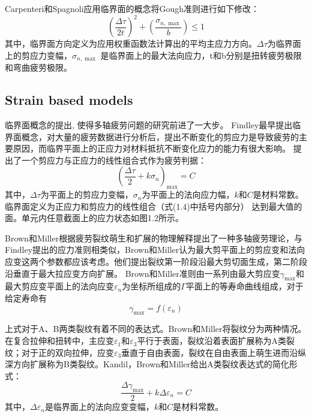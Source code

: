 Carpenteri和Spagnoli\cite{carpinteri2001multiaxial}应用临界面的概念将Gough准则进行如下修改：
\[{\left( {\frac{{\Delta \tau }}{{2t}}} \right)^2} + \left( {\frac{{{\sigma _{n,\max }}}}{b}} \right) \le 1\]
其中，临界面方向定义为应用权重函数法计算出的平均主应力方向。${\Delta \tau }$为临界面上的剪应力变幅，${\sigma _{n,\max }}$
是临界面上的最大法向应力，t和b分别是扭转疲劳极限和弯曲疲劳极限。


\subsection{Strain based models}

临界面概念的提出, 使得多轴疲劳问题的研究前进了一大步。
Findley\cite{findley1953combined,findley1954modified,findley1956theory,findley1958theory}最早提出临界面概念，对大量的疲劳数据进行分析后，提出不断变化的剪应力是导致疲劳的主要原因，而临界平面上的正应力对材料抵抗不断变化应力的能力有很大影响。
提出了一个剪应力与正应力的线性组合式作为疲劳判据：
\[{\left( {\frac{{\Delta \tau }}{2} + k{\sigma _n}} \right)_{\max }} = C\]
其中，${\Delta \tau }$为平面上的剪应力变幅，${\sigma _n}$为平面上的法向应力幅，$k$和$C$是材料常数。
临界面定义为正应力和剪应力的线性组合（式(1.4)中括号内部分）
达到最大值的面。单元内任意截面上的应力状态如图1.2所示。

Brown和Miller\cite{brown1973theory}根据疲劳裂纹萌生和扩展的物理解释提出了一种多轴疲劳理论，与Findley\cite{findley1958theory}提出的应力准则相类似，Brown和Miller认为最大剪平面上的剪应变和法向应变这两个参数都应该考虑。他们提出裂纹第一阶段沿最大剪切面生成，第二阶段沿垂直于最大拉应变方向扩展。
Brown和Miller准则由一系列由最大剪应变${\gamma _{\max }}$和最大剪应变平面上的法向应变${\varepsilon _n}$为坐标所组成的$\Gamma$平面上的等寿命曲线组成，对于给定寿命有
\[{\gamma _{\max }} = f\left( {{\varepsilon _n}} \right)\]

上式对于A、B两类裂纹有着不同的表达式。Brown和Miller将裂纹分为两种情况。在复合拉伸和扭转中，主应变${\varepsilon _1}$和${\varepsilon _3}$平行于表面，裂纹沿着表面扩展称为A类裂纹；对于正的双向拉伸，应变${\varepsilon _3}$垂直于自由表面，裂纹在自由表面上萌生进而沿纵深方向扩展称为B类裂纹。Kandil，Brown和Miller\cite{Kandil1982}给出A类裂纹表达式的简化形式：
\[\frac{{\Delta {\gamma _{\max }}}}{2} + k\Delta {\varepsilon _n} = C\]
其中，$\Delta {\varepsilon _n}$是临界面上的法向应变变幅，$k$和$C$是材料常数。

